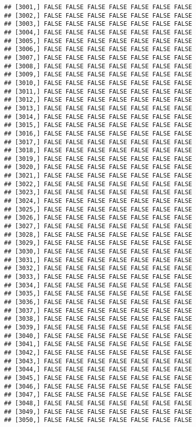 \documentclass[
]{article}
\begin{document}
\begin{verbatim}
## [3001,] FALSE FALSE FALSE FALSE FALSE FALSE FALSE
## [3002,] FALSE FALSE FALSE FALSE FALSE FALSE FALSE
## [3003,] FALSE FALSE FALSE FALSE FALSE FALSE FALSE
## [3004,] FALSE FALSE FALSE FALSE FALSE FALSE FALSE
## [3005,] FALSE FALSE FALSE FALSE FALSE FALSE FALSE
## [3006,] FALSE FALSE FALSE FALSE FALSE FALSE FALSE
## [3007,] FALSE FALSE FALSE FALSE FALSE FALSE FALSE
## [3008,] FALSE FALSE FALSE FALSE FALSE FALSE FALSE
## [3009,] FALSE FALSE FALSE FALSE FALSE FALSE FALSE
## [3010,] FALSE FALSE FALSE FALSE FALSE FALSE FALSE
## [3011,] FALSE FALSE FALSE FALSE FALSE FALSE FALSE
## [3012,] FALSE FALSE FALSE FALSE FALSE FALSE FALSE
## [3013,] FALSE FALSE FALSE FALSE FALSE FALSE FALSE
## [3014,] FALSE FALSE FALSE FALSE FALSE FALSE FALSE
## [3015,] FALSE FALSE FALSE FALSE FALSE FALSE FALSE
## [3016,] FALSE FALSE FALSE FALSE FALSE FALSE FALSE
## [3017,] FALSE FALSE FALSE FALSE FALSE FALSE FALSE
## [3018,] FALSE FALSE FALSE FALSE FALSE FALSE FALSE
## [3019,] FALSE FALSE FALSE FALSE FALSE FALSE FALSE
## [3020,] FALSE FALSE FALSE FALSE FALSE FALSE FALSE
## [3021,] FALSE FALSE FALSE FALSE FALSE FALSE FALSE
## [3022,] FALSE FALSE FALSE FALSE FALSE FALSE FALSE
## [3023,] FALSE FALSE FALSE FALSE FALSE FALSE FALSE
## [3024,] FALSE FALSE FALSE FALSE FALSE FALSE FALSE
## [3025,] FALSE FALSE FALSE FALSE FALSE FALSE FALSE
## [3026,] FALSE FALSE FALSE FALSE FALSE FALSE FALSE
## [3027,] FALSE FALSE FALSE FALSE FALSE FALSE FALSE
## [3028,] FALSE FALSE FALSE FALSE FALSE FALSE FALSE
## [3029,] FALSE FALSE FALSE FALSE FALSE FALSE FALSE
## [3030,] FALSE FALSE FALSE FALSE FALSE FALSE FALSE
## [3031,] FALSE FALSE FALSE FALSE FALSE FALSE FALSE
## [3032,] FALSE FALSE FALSE FALSE FALSE FALSE FALSE
## [3033,] FALSE FALSE FALSE FALSE FALSE FALSE FALSE
## [3034,] FALSE FALSE FALSE FALSE FALSE FALSE FALSE
## [3035,] FALSE FALSE FALSE FALSE FALSE FALSE FALSE
## [3036,] FALSE FALSE FALSE FALSE FALSE FALSE FALSE
## [3037,] FALSE FALSE FALSE FALSE FALSE FALSE FALSE
## [3038,] FALSE FALSE FALSE FALSE FALSE FALSE FALSE
## [3039,] FALSE FALSE FALSE FALSE FALSE FALSE FALSE
## [3040,] FALSE FALSE FALSE FALSE FALSE FALSE FALSE
## [3041,] FALSE FALSE FALSE FALSE FALSE FALSE FALSE
## [3042,] FALSE FALSE FALSE FALSE FALSE FALSE FALSE
## [3043,] FALSE FALSE FALSE FALSE FALSE FALSE FALSE
## [3044,] FALSE FALSE FALSE FALSE FALSE FALSE FALSE
## [3045,] FALSE FALSE FALSE FALSE FALSE FALSE FALSE
## [3046,] FALSE FALSE FALSE FALSE FALSE FALSE FALSE
## [3047,] FALSE FALSE FALSE FALSE FALSE FALSE FALSE
## [3048,] FALSE FALSE FALSE FALSE FALSE FALSE FALSE
## [3049,] FALSE FALSE FALSE FALSE FALSE FALSE FALSE
## [3050,] FALSE FALSE FALSE FALSE FALSE FALSE FALSE

\end{verbatim}
\end{document}
